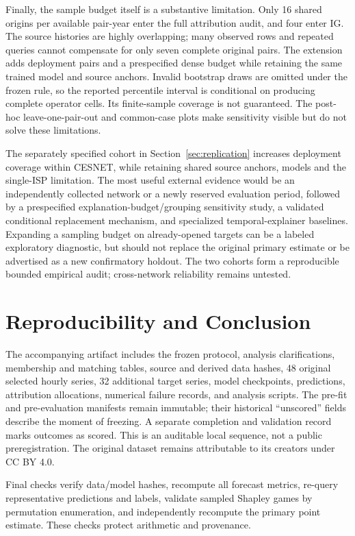 \documentclass[conference]{IEEEtran}
\begin{document}
Finally, the sample budget itself is a substantive limitation. Only 16 shared origins per available pair-year enter the full attribution audit, and four enter IG. The source histories are highly overlapping; many observed rows and repeated queries cannot compensate for only seven complete original pairs. The extension adds deployment pairs and a prespecified dense budget while retaining the same trained model and source anchors. Invalid bootstrap draws are omitted under the frozen rule, so the reported percentile interval is conditional on producing complete operator cells. Its finite-sample coverage is not guaranteed. The post-hoc leave-one-pair-out and common-case plots make sensitivity visible but do not solve these limitations.

The separately specified cohort in Section~\ref{sec:replication} increases deployment coverage within CESNET, while retaining shared source anchors, models and the single-ISP limitation. The most useful external evidence would be an independently collected network or a newly reserved evaluation period, followed by a prespecified explanation-budget/grouping sensitivity study, a validated conditional replacement mechanism, and specialized temporal-explainer baselines. Expanding a sampling budget on already-opened targets can be a labeled exploratory diagnostic, but should not replace the original primary estimate or be advertised as a new confirmatory holdout. The two cohorts form a reproducible bounded empirical audit; cross-network reliability remains untested.


\section{Reproducibility and Conclusion}
The accompanying artifact includes the frozen protocol, analysis clarifications, membership and matching tables, source and derived data hashes, 48 original selected hourly series, 32 additional target series, model checkpoints, predictions, attribution allocations, numerical failure records, and analysis scripts. The pre-fit and pre-evaluation manifests remain immutable; their historical ``unscored'' fields describe the moment of freezing. A separate completion and validation record marks outcomes as scored. This is an auditable local sequence, not a public preregistration. The original dataset remains attributable to its creators under CC BY 4.0.

Final checks verify data/model hashes, recompute all forecast metrics, re-query representative predictions and labels, validate sampled Shapley games by permutation enumeration, and independently recompute the primary point estimate. These checks protect arithmetic and provenance.
\end{document}
